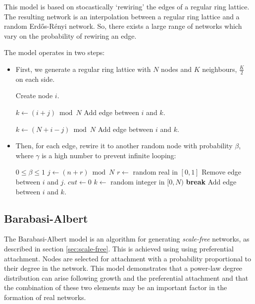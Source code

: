 \documentclass[a4paper,11pt,titlepage]{article}
\begin{document}
This model is based on stocastically `rewiring' the edges of a regular ring
lattice. The resulting network is an interpolation between a regular ring lattice
and a random Erd\H{o}s-R\'{e}nyi network. So, there exists a large range of
networks which vary on the probability of rewiring an edge.


The model operates in two steps:

\begin{itemize}

\item
  First, we generate a regular ring lattice with $N$ nodes and $K$ neighbours,
  $\frac{K}{2}$ on each side.

  \begin{algorithmic}
      \STATE Create node $i$.
    \ENDFOR

        \STATE $k \gets (i + j) \bmod{N}$
        \STATE Add edge between $i$ and $k$.
      \ENDFOR

        \STATE $k \gets (N + i - j) \bmod{N}$
        \STATE Add edge between $i$ and $k$.
      \ENDFOR
    \ENDFOR
  \end{algorithmic}

\item
  Then, for each edge, rewire it to another random node with probability
  $\beta$, where $\gamma$ is a high number to prevent infinite looping:

  \begin{algorithmic}
    \REQUIRE $0 \leq \beta \leq 1$
        \STATE $j \gets (n + r) \bmod{N}$
        \STATE $r \gets$ random real in $[0, 1]$
          \STATE Remove edge between $i$ and $j$.
          \STATE $cut \gets 0$
            \STATE $k \gets$ random integer in $[0, N)$
              \STATE \textbf{break}
            \ELSE
              \STATE Add edge between $i$ and $k$.
            \ENDIF
          \ENDFOR
        \ENDIF
      \ENDFOR
    \ENDFOR
  \end{algorithmic}
\end{itemize}

\subsection{Barabasi-Albert}
The Barabasi-Albert model is an algorithm for generating \emph{scale-free}
networks, as described in section \ref{sec:scale-free}. This is achieved using
using preferential attachment. Nodes are selected for attachment with a
probability proportional to their degree in the network. This model demonstrates
that a power-law degree distribution can arise following growth and the
preferential attachment and that the combination of these two elements may be an
important factor in the formation of real networks. \cite{oconn11}
\end{document}
